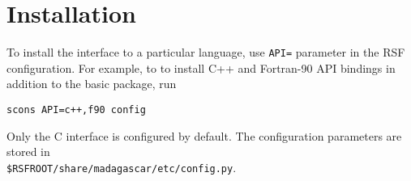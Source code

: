 \section{Installation} 

To install the interface to a particular language, use \texttt{API=}
parameter in the RSF configuration. For example, to to install C++ and
Fortran-90 API bindings in addition to the basic package, run
\begin{verbatim}
scons API=c++,f90 config
\end{verbatim}
Only the C interface is configured by default. The configuration
parameters are stored in \\ \texttt{\$RSFROOT/share/madagascar/etc/config.py}.

 


